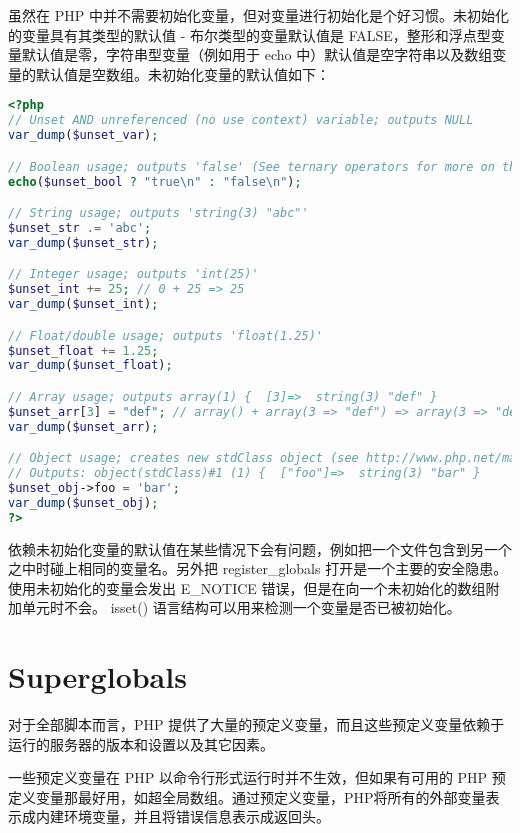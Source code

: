 虽然在 PHP 中并不需要初始化变量，但对变量进行初始化是个好习惯。未初始化的变量具有其类型的默认值 - 布尔类型的变量默认值是 FALSE，整形和浮点型变量默认值是零，字符串型变量（例如用于 echo 中）默认值是空字符串以及数组变量的默认值是空数组。未初始化变量的默认值如下：


\begin{lstlisting}[language=PHP]
<?php
// Unset AND unreferenced (no use context) variable; outputs NULL
var_dump($unset_var);

// Boolean usage; outputs 'false' (See ternary operators for more on this syntax)
echo($unset_bool ? "true\n" : "false\n");

// String usage; outputs 'string(3) "abc"'
$unset_str .= 'abc';
var_dump($unset_str);

// Integer usage; outputs 'int(25)'
$unset_int += 25; // 0 + 25 => 25
var_dump($unset_int);

// Float/double usage; outputs 'float(1.25)'
$unset_float += 1.25;
var_dump($unset_float);

// Array usage; outputs array(1) {  [3]=>  string(3) "def" }
$unset_arr[3] = "def"; // array() + array(3 => "def") => array(3 => "def")
var_dump($unset_arr);

// Object usage; creates new stdClass object (see http://www.php.net/manual/en/reserved.classes.php)
// Outputs: object(stdClass)#1 (1) {  ["foo"]=>  string(3) "bar" }
$unset_obj->foo = 'bar';
var_dump($unset_obj);
?>
\end{lstlisting}

依赖未初始化变量的默认值在某些情况下会有问题，例如把一个文件包含到另一个之中时碰上相同的变量名。另外把 register\_globals 打开是一个主要的安全隐患。使用未初始化的变量会发出 E\_NOTICE 错误，但是在向一个未初始化的数组附加单元时不会。 isset() 语言结构可以用来检测一个变量是否已被初始化。



\chapter{Superglobals}


对于全部脚本而言，PHP 提供了大量的预定义变量，而且这些预定义变量依赖于运行的服务器的版本和设置以及其它因素。



一些预定义变量在 PHP 以命令行形式运行时并不生效，但如果有可用的 PHP 预定义变量那最好用，如超全局数组。通过预定义变量，PHP将所有的外部变量表示成内建环境变量，并且将错误信息表示成返回头。






